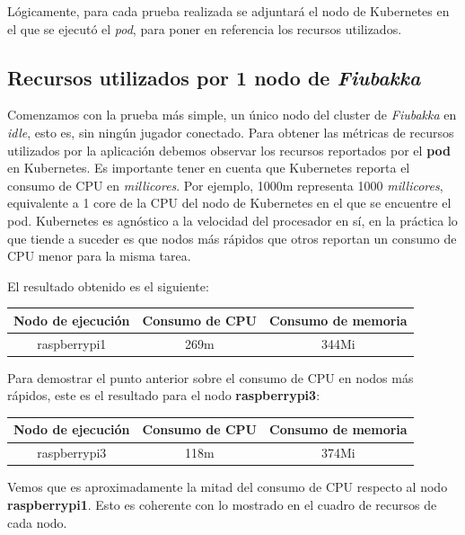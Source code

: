 \noindent Lógicamente, para cada prueba realizada se adjuntará el nodo de Kubernetes en el que se ejecutó el \textit{pod}, para poner en referencia los recursos utilizados.

\subsection{Recursos utilizados por 1 nodo de \textit{Fiubakka}}

\noindent Comenzamos con la prueba más simple, un único nodo del cluster de \textit{Fiubakka} en \textit{idle}, esto es, sin ningún jugador conectado.
Para obtener las métricas de recursos utilizados por la aplicación debemos observar los recursos reportados por el \textbf{pod} en Kubernetes.
Es importante tener en cuenta que Kubernetes reporta el consumo de CPU en \textit{millicores}. Por ejemplo, 1000m representa 1000 \textit{millicores}, equivalente
a 1 core de la CPU del nodo de Kubernetes en el que se encuentre el pod. Kubernetes es agnóstico a la velocidad del procesador en sí, en la práctica lo que tiende a suceder
es que nodos más rápidos que otros reportan un consumo de CPU menor para la misma tarea.

\noindent El resultado obtenido es el siguiente:

\begin{center}
\begin{tabular}{|c|c|c|}
    \hline
    \textbf{Nodo de ejecución} & \textbf{Consumo de CPU} & \textbf{Consumo de memoria} \\
    \hline
    raspberrypi1 & 269m & 344Mi \\
    \hline
\end{tabular}
\end{center}

\noindent Para demostrar el punto anterior sobre el consumo de CPU en nodos más rápidos, este es el resultado para el nodo \textbf{raspberrypi3}:

\begin{center}
\begin{tabular}{|c|c|c|}
    \hline
    \textbf{Nodo de ejecución} & \textbf{Consumo de CPU} & \textbf{Consumo de memoria} \\
    \hline
    raspberrypi3 & 118m & 374Mi \\
    \hline
\end{tabular}
\end{center}

\noindent Vemos que es aproximadamente la mitad del consumo de CPU respecto al nodo \textbf{raspberrypi1}. Esto es coherente con lo mostrado en el cuadro de recursos de cada
nodo.


